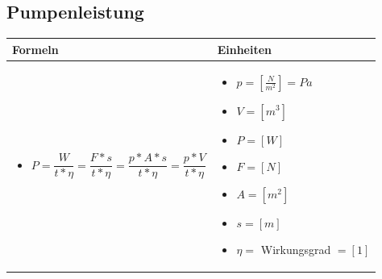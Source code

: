 \subsection{Pumpenleistung}				%
\begin{table}[h!]
	\begin{tabular}{ | m{9cm} | m{9cm}  | }
		\hline
		Formeln & Einheiten \\ \hline
		\midrule
		\begin{itemize}
			\item $P=\dfrac{W}{t*\eta}=\dfrac{F*s}{t*\eta}=\dfrac{p*A*s}{t*\eta}=\dfrac{p*V}{t*\eta}$	
		\end{itemize}
		&
		\begin{itemize}
			\item $p= [\frac{N}{m^{2}}]=Pa$
			\item $V=[m^3]$
			\item $P=[W]$
			\item $F=[N]$
			\item $A=[m^{2}]$
			\item $s=[m]$
			\item $\eta=$ Wirkungsgrad $=[1]$
		\end{itemize}
		\\ \hline
	\end{tabular}
\end{table}

\newpage

